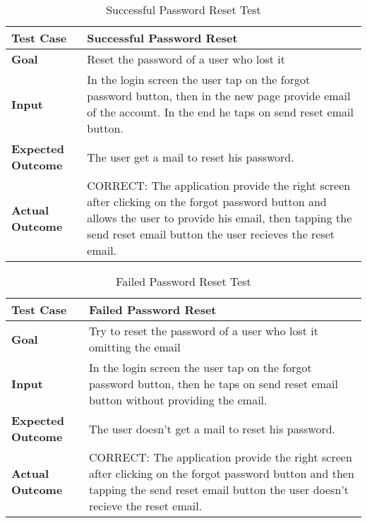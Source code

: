 \begin{table}[H]
	\centering
	\begin{tabular}{ll}
	\hline
	\textbf{Test Case}& Successful Password Reset\\
	\hline
	\textbf{Goal}& Reset the password of a user who lost it\\
	\hline
	\textbf{Input}& In the login screen the user tap on the forgot password button, then in the new page provide email of the account. In the end he taps on send reset email button.\\
	\hline
	\textbf{Expected Outcome}& The user get a mail to reset his password.\\
	\hline
	\textbf{Actual Outcome}& CORRECT: The application provide the right screen after clicking on the forgot password button and allows the user to provide his email, then tapping the send reset email button the user recieves the reset email.\\
	\hline	
	\end{tabular}
	\caption{Successful Password Reset Test}
\end{table}

\begin{table}[H]
	\centering
	\begin{tabular}{ll}
	\hline
	\textbf{Test Case}& Failed Password Reset\\
	\hline
	\textbf{Goal}& Try to reset the password of a user who lost it omitting the email\\
	\hline
	\textbf{Input}& In the login screen the user tap on the forgot password button, then he taps on send reset email button without providing the email.\\
	\hline
	\textbf{Expected Outcome}& The user doesn't get a mail to reset his password.\\
	\hline
	\textbf{Actual Outcome}& CORRECT: The application provide the right screen after clicking on the forgot password button and then tapping the send reset email button the user doesn't recieve the reset email.\\
	\hline	
	\end{tabular}
	\caption{Failed Password Reset Test}
\end{table}

